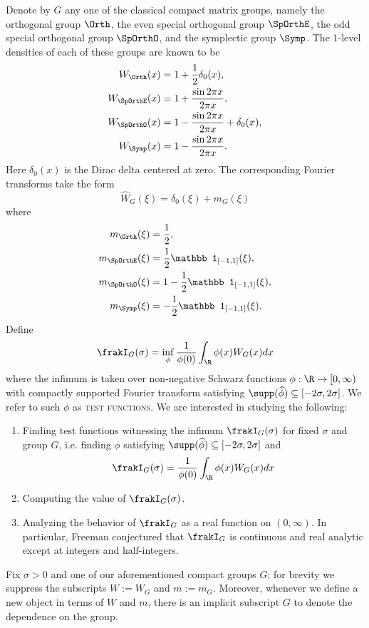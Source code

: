 Denote by $G$ any one of the classical compact matrix groups, namely the orthogonal group $\Orth$, the even special orthogonal group $\SpOrthE$, the odd special orthogonal group $\SpOrthO$, and the symplectic group $\Symp$. The $1$-level densities of each of these groups are known to be
\begin{align*}
	W_\Orth (x) 
		&= 1 + \frac12 \delta_0 (x), \\
	W_{\SpOrthE} (x) 
		&= 1 + \frac{\sin 2\pi x}{2\pi x}, \\
	W_{\SpOrthO} (x)
		&= 1 - \frac{\sin 2 \pi x}{2 \pi x} + \delta_0 (x), \\
	W_{\Symp} (x)
		&= 1 - \frac{\sin 2\pi x}{2\pi x}.			
\end{align*}
Here $\delta_0 (x)$ is the Dirac delta centered at zero. The corresponding Fourier transforms take the form
	\[ \widehat W_G (\xi) = \delta_0 (\xi) + m_G (\xi) \]
where
\begin{align*}
	m_\Orth (\xi) 
		&= \frac12, \\
	m_{\SpOrthE} (\xi)
		&= \frac12 \mathbb 1_{[-1, 1]} (\xi), \\
	m_{\SpOrthO} (\xi)
		&= 1 - \frac12 \mathbb 1_{[-1, 1]} (\xi), \\
	m_{\Symp} (\xi)	
		&= - \frac12 \mathbb 1_{[-1, 1]} (\xi).	
\end{align*}
Define
	\[ \frakI_G (\sigma) = \inf_\phi \frac{1}{\phi(0)} \int_\R \phi(x) W_G (x) dx \]
where the infimum is taken over non-negative Schwarz functions $\phi : \R \to [0, \infty)$ with compactly supported Fourier transform satisfying $\supp (\widehat \phi) \subseteq [-2\sigma, 2\sigma]$. We refer to such $\phi$ as \textsc{test functions}. We are interested in studying the following:
\begin{enumerate}
	\item Finding test functions witnessing the infimum $\frakI_G (\sigma)$ for fixed $\sigma$ and group $G$, i.e. finding $\phi$ satisfying $\supp(\widehat \phi) \subseteq [-2\sigma, 2\sigma]$ and
			\[ \frakI_G (\sigma) = \frac{1}{\phi(0)} \int_\R \phi(x) W_G (x) dx \]
	 
	\item Computing the value of $\frakI_G (\sigma)$. 
	\item Analyzing the behavior of $\frakI_G$ as a real function on $(0, \infty)$. In particular, Freeman conjectured that $\frakI_G$ is continuous and real analytic except at integers and half-integers. 
\end{enumerate}
Fix $\sigma > 0$ and one of our aforementioned compact groups $G$; for brevity we suppress the subscripts $W := W_G$ and $m := m_G$. Moreover, whenever we define a new object in terms of $W$ and $m$, there is an implicit subscript $G$ to denote the dependence on the group. 


